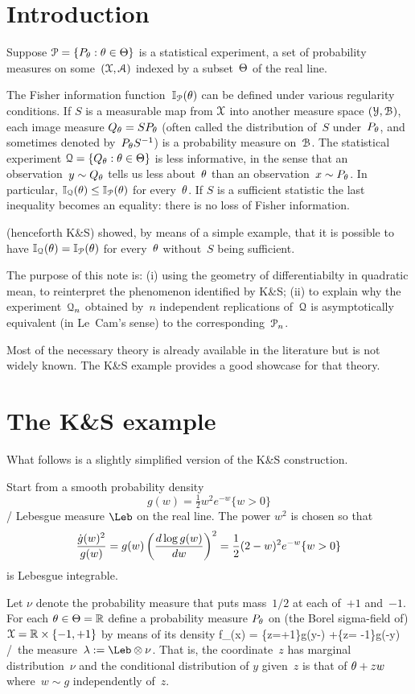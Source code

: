 \documentclass[aos]{imsart}
\begin{document}
%
\section{Introduction}  \label{intro}
Suppose ${\EuScript P}=\{P_\theta: \theta\in\Theta\}$ is a
statistical experiment, a set of probability measures
on some~$({\EuScript X},{\EuScript A})$ indexed by a subset~$\Theta$ of the real line.

The Fisher information function~${\mathbb I}_{\EuScript P}(\theta)$ can be defined under
various regularity conditions.  If $S$ is a measurable map from  ${\EuScript X}$
into another measure space $({\EuScript Y},{\EuScript B})$, each image measure $Q_\theta =
S P_\theta$ (often called the distribution of~$S$ under~$P_\theta$, and sometimes denoted
by~$P_\theta S^{-1}$) is a probability measure on~${\EuScript B}$. The
statistical experiment ${\EuScript Q}=\{Q_\theta:\theta\in\Theta\}$ is  less
informative, in the sense that an observation~$y\sim Q_\theta$ tells us
less about~$\theta$ than an observation~$x\sim P_\theta$.  In particular,
${\mathbb I}_{\EuScript Q}(\theta)\le {\mathbb I}_{\EuScript P}(\theta)$ for every~$\theta$. If $S$ is a sufficient
statistic the last inequality becomes an equality: there is no loss of
Fisher information.

\citet{KaganShepp05AmStat} (henceforth K\&S) showed, by means of a
simple example, that it is possible to have ${\mathbb I}_{\EuScript Q}(\theta)=
{\mathbb I}_{\EuScript P}(\theta)$ for every~$\theta$ without~$S$ being sufficient.

The purpose of this note is: (i) using the geometry of
differentiabilty in quadratic mean, to reinterpret the phenomenon
identified by K\&S; (ii) to explain why the experiment~${\EuScript Q}_n$
obtained by~$n$ independent replications of~${\EuScript Q}$ is asymptotically
equivalent (in Le~Cam's sense) to the corresponding~${\EuScript P}_n$.

Most of the necessary theory is already available in the literature
but is not widely known.  The K\&S example provides a good showcase 
for that theory.


\section{The K\&S example} \label{KSeg}
What follows is a slightly simplified version of the K\&S
construction.

Start from a smooth probability density
$$
g(w) = \tfrac12 w^2 e^{-w}\{w>0\}
$$
\wrt/ Lebesgue measure $\Leb$ on the real line. 
The power $w^2$ is chosen so that
$$
\frac{{\dot g}(w)^2}{g(w)} = g(w) \left(\frac{d\log g(w)}{dw}\right)^2=\frac12 (2-w)^2e^{-w}\{w>0\}
$$
is Lebesgue integrable.

Let $\nu$ denote the probability measure that puts mass~$1/2$ at each
of~$+1$ and~$-1$. For  each $\theta\in\Theta={\mathbb R}$ define a probability
measure $P_\theta$ on (the Borel sigma-field of) ${\EuScript X}={\mathbb R}\times\{-1,+1\}$
by means of its density
\beq
f_\th(x) = \{z=+1\}g(y-\th) +\{z= -1\}g(\th-y)
\label{f.def}
\eeq
\wrt/~the measure~$\lam:=\Leb\otimes\nu$. That is, the coordinate~$z$
has marginal distribution~$\nu$ and the conditional distribution of
$y$ given~$z$ is that of $\theta+zw$ where~$w\sim g$ independently of~$z$.
\end{document}
